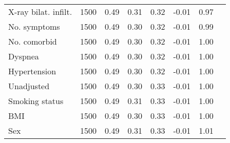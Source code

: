\documentclass{article}
\begin{document}
{\begin{longtable}{lccccccc}
X-ray bilat. infilt. & 1500 & 0.49 & 0.31 & 0.32 & -0.01 & 0.97 \\ 
No. symptoms & 1500 & 0.49 & 0.30 & 0.32 & -0.01 & 0.99 \\ 
No. comorbid & 1500 & 0.49 & 0.30 & 0.32 & -0.01 & 1.00 \\ 
Dyspnea & 1500 & 0.49 & 0.30 & 0.32 & -0.01 & 1.00 \\ 
Hypertension & 1500 & 0.49 & 0.30 & 0.32 & -0.01 & 1.00 \\ 
Unadjusted & 1500 & 0.49 & 0.30 & 0.33 & -0.01 & 1.00 \\ 
Smoking status & 1500 & 0.49 & 0.31 & 0.33 & -0.01 & 1.00 \\ 
BMI & 1500 & 0.49 & 0.30 & 0.33 & -0.01 & 1.00 \\ 
Sex & 1500 & 0.49 & 0.31 & 0.33 & -0.01 & 1.01 \\
\bottomrule
\hline
\end{longtable}
}

\clearpage
\end{document}
